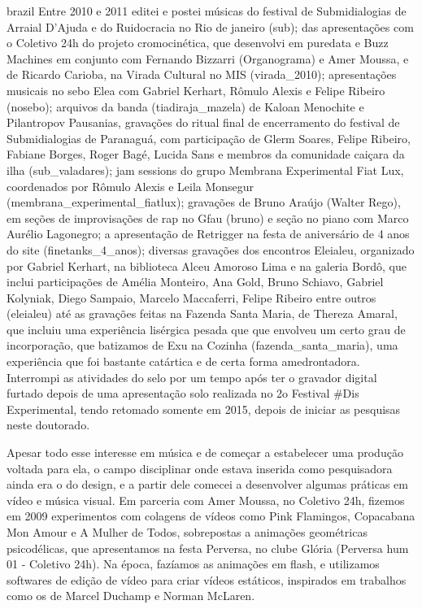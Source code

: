 \begin{otherlanguage*}{brazil}
Entre 2010 e 2011 editei e postei músicas do festival de Submidialogias de Arraial D'Ajuda e do Ruidocracia no Rio de janeiro (\/sub\/); das apresentações com o Coletivo 24h do projeto cromocinética, que desenvolvi em puredata e Buzz Machines em conjunto com Fernando Bizzarri (Organograma) e Amer Moussa, e de Ricardo Carioba, na Virada Cultural no MIS (virada\_2010\/); apresentações musicais no sebo Elea com Gabriel Kerhart, Rômulo Alexis e Felipe Ribeiro (nosebo\/); arquivos da banda (tiadiraja\_mazela\/) de Kaloan Menochite e Pilantropov Pausanias, gravações do ritual final de encerramento do festival de Submidialogias de Paranaguá, com participação de Glerm Soares, Felipe Ribeiro, Fabiane Borges, Roger Bagé, Lucida Sans e membros da comunidade caiçara da ilha (\/sub\_valadares\/); jam sessions do grupo Membrana Experimental Fiat Lux, coordenados por Rômulo Alexis e Leila Monsegur (membrana\_experimental\_fiatlux\/); gravações de Bruno Araújo (Walter Rego), em seções de improvisações de rap no Gfau (bruno\/) e seção no piano com Marco Aurélio Lagonegro; a apresentação de Retrigger na festa de aniversário de 4 anos do site (finetanks\_4\_anos\/); diversas gravações dos encontros Eleialeu, organizado por Gabriel Kerhart, na biblioteca Alceu Amoroso Lima e na galeria Bordô, que inclui participações de Amélia Monteiro, Ana Gold, Bruno Schiavo, Gabriel Kolyniak, Diego Sampaio, Marcelo Maccaferri, Felipe Ribeiro entre outros (\/eleialeu\/) até as gravações feitas na Fazenda Santa Maria, de Thereza Amaral, que incluiu uma experiência lisérgica pesada que que envolveu um certo grau de incorporação, que batizamos de Exu na Cozinha (\/fazenda\_santa\_maria\/), uma experiência que foi bastante catártica e de certa forma amedrontadora. 
Interrompi as atividades do selo por um tempo após ter o gravador digital furtado depois de uma apresentação solo realizada no 2o Festival \#Dis Experimental, tendo retomado somente em 2015, depois de iniciar as pesquisas neste doutorado. 

Apesar todo esse interesse em música e de começar a estabelecer uma produção voltada para ela, o campo disciplinar onde estava inserida como pesquisadora ainda era o do design, e a partir dele comecei a desenvolver algumas práticas em vídeo e música visual. Em parceria com Amer Moussa, no Coletivo 24h, fizemos em 2009 experimentos com colagens de vídeos como Pink Flamingos, Copacabana Mon Amour e A Mulher de Todos, sobrepostas a animações geométricas psicodélicas, que apresentamos na festa Perversa, no clube Glória (Perversa hum 01 - Coletivo 24h). Na época, fazíamos as animações em flash, e utilizamos softwares de edição de vídeo para criar vídeos estáticos, inspirados em trabalhos como os de Marcel Duchamp e Norman McLaren. 


\end{otherlanguage*}
